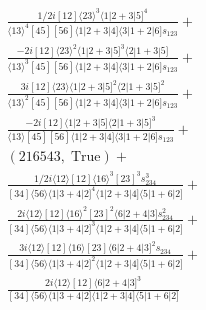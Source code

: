 \documentclass[varwidth, border=5pt]{standalone}
\begin{document}
\begin{my}
$\begin{gathered}
\scriptscriptstyle\frac{1/2i[12]⟨23⟩^3⟨1|2+3|5]^4}{⟨13⟩^4[45][56]⟨1|2+3|4]⟨3|1+2|6]s_{123}}+\\
\scriptscriptstyle\frac{-2i[12]⟨23⟩^2⟨1|2+3|5]^3⟨2|1+3|5]}{⟨13⟩^3[45][56]⟨1|2+3|4]⟨3|1+2|6]s_{123}}+\\
\scriptscriptstyle\frac{3i[12]⟨23⟩⟨1|2+3|5]^2⟨2|1+3|5]^2}{⟨13⟩^2[45][56]⟨1|2+3|4]⟨3|1+2|6]s_{123}}+\\
\scriptscriptstyle\frac{-2i[12]⟨1|2+3|5]⟨2|1+3|5]^3}{⟨13⟩[45][56]⟨1|2+3|4]⟨3|1+2|6]s_{123}}+\\
\scriptscriptstyle(216543,\;\text{True})+\\
\scriptscriptstyle\frac{1/2i⟨12⟩[12]⟨16⟩^3[23]^3s_{234}^3}{[34]⟨56⟩⟨1|3+4|2]^4⟨1|2+3|4]⟨5|1+6|2]}+\\
\scriptscriptstyle\frac{2i⟨12⟩[12]⟨16⟩^2[23]^2⟨6|2+4|3]s_{234}^2}{[34]⟨56⟩⟨1|3+4|2]^3⟨1|2+3|4]⟨5|1+6|2]}+\\
\scriptscriptstyle\frac{3i⟨12⟩[12]⟨16⟩[23]⟨6|2+4|3]^2s_{234}}{[34]⟨56⟩⟨1|3+4|2]^2⟨1|2+3|4]⟨5|1+6|2]}+\\
\scriptscriptstyle\frac{2i⟨12⟩[12]⟨6|2+4|3]^3}{[34]⟨56⟩⟨1|3+4|2]⟨1|2+3|4]⟨5|1+6|2]}\phantom{+}
\end{gathered}$
\end{my}
\end{document}
